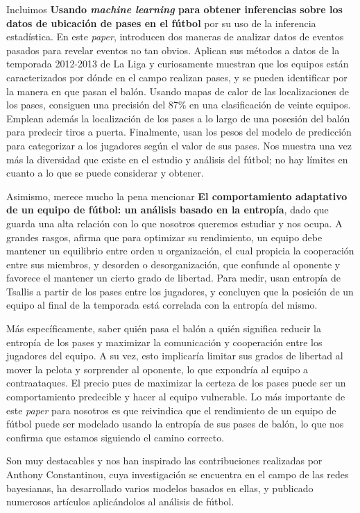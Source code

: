 Incluimos \textbf{Usando \textit{machine learning} para obtener inferencias sobre los datos de 
ubicación de pases en el fútbol}\cite{ML-inference} por su uso de la inferencia estadística. 
En este \textit{paper}, introducen dos maneras de analizar datos de eventos pasados para 
revelar eventos no tan obvios. Aplican sus métodos a datos de la temporada 2012-2013 de La Liga 
y curiosamente muestran que los equipos están caracterizados por dónde en el campo realizan pases, y se 
pueden identificar por la manera en que pasan el balón. Usando mapas de calor de las localizaciones 
de los pases, consiguen una precisión del 87\% en una clasificación de veinte equipos. Emplean 
además la localización de los pases a lo largo de una posesión del balón para predecir tiros a 
puerta. Finalmente, usan los pesos del modelo de predicción para categorizar a los jugadores 
según el valor de sus pases. Nos muestra una vez más la diversidad que existe en el estudio 
y análisis del fútbol; no hay límites en cuanto a lo que se puede considerar y obtener.

Asimismo, merece mucho la pena mencionar \textbf{El comportamiento adaptativo de un equipo 
de fútbol: un análisis basado en la entropía}\cite{entropy-analysis}, dado que guarda una 
alta relación con lo que nosotros queremos estudiar y nos ocupa. A grandes rasgos, afirma que 
para optimizar su rendimiento, un equipo debe mantener un equilibrio entre orden u organización, el cual 
propicia la cooperación entre sus miembros, y desorden o desorganización, que confunde 
al oponente y favorece el mantener un cierto grado de libertad. Para medir, usan entropía de 
Tsallis a partir de los pases entre los jugadores, y concluyen que la posición de un equipo al final de la temporada está 
correlada con la entropía del mismo. 

Más específicamente, saber quién pasa el balón a quién significa reducir la entropía de los pases y maximizar 
la comunicación y cooperación entre los jugadores del equipo. A su vez, esto implicaría limitar sus 
grados de libertad al mover la pelota y sorprender al oponente, lo que expondría al equipo a contraataques. El precio 
pues de maximizar la certeza de los pases puede ser un comportamiento predecible y hacer al equipo vulnerable. Lo más importante 
de este \textit{paper} para nosotros es que reivindica que el rendimiento de un equipo de fútbol puede 
ser modelado usando la entropía de sus pases de balón, lo que nos confirma que estamos siguiendo el camino correcto.

Son muy destacables y nos han inspirado las contribuciones realizadas por Anthony 
Constantinou\cite{a-constantinou}, cuya investigación se encuentra en el campo 
de las redes bayesianas, ha desarrollado varios modelos basados en ellas, y publicado 
numerosos artículos aplicándolos al análisis de fútbol. 

